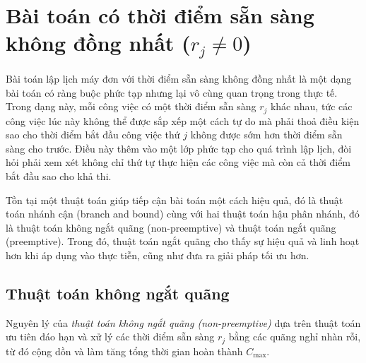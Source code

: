\documentclass[12pt,a4paper]{report}
\begin{document}
\section{Bài toán có thời điểm sẵn sàng không đồng nhất ($r_j \neq 0$)}
Bài toán lập lịch máy đơn với thời điểm sẵn sàng không đồng nhất là một dạng bài toán có ràng buộc phức tạp nhưng lại vô cùng quan trọng trong thực tế. Trong dạng này, mỗi công việc có một thời điểm sẵn sàng $r_j$ khác nhau, tức các công việc lúc này không thể được sắp xếp một cách tự do mà phải thoả điều kiện sao cho thời điểm bắt đầu công việc thứ $j$ không được sớm hơn thời điểm sẵn sàng cho trước. Điều này thêm vào một lớp phức tạp cho quá trình lập lịch, đòi hỏi phải xem xét không chỉ thứ tự thực hiện các công việc mà còn cả thời điểm bắt đầu sao cho khả thi.

Tồn tại một thuật toán giúp tiếp cận bài toán một cách hiệu quả, đó là thuật toán nhánh cận (branch and bound) cùng với hai thuật toán hậu phân nhánh, đó là thuật toán không ngắt quãng (non-preemptive) và thuật toán ngắt quãng (preemptive). Trong đó, thuật toán ngắt quãng cho thấy sự hiệu quả và linh hoạt hơn khi áp dụng vào thực tiễn, cũng như đưa ra giải pháp tối ưu hơn.

\subsection*{Thuật toán không ngắt quãng}
Nguyên lý của \textit{thuật toán không ngắt quãng (non-preemptive)} dựa trên thuật toán ưu tiên đáo hạn và xử lý các thời điểm sẵn sàng $r_j$ bằng các quãng nghỉ nhàn rỗi, từ đó cộng dồn và làm tăng tổng thời gian hoàn thành $C_{\max}$.
\end{document}
